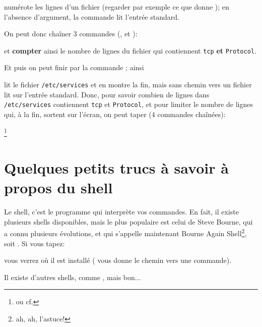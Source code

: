 \begin{itemize}
\begin{itemize}
    numérote les lignes d'un
    fichier (regarder par exemple ce que donne ); en l'absence d'argument, la commande 
    lit l'entrée standard.

    On peut donc chaîner 3 commandes (,  et ):
    

    et \textbf{compter} ainsi le nombre de lignes du fichier
     qui contiennent \texttt{tcp} \textbf{et}
    \texttt{Protocol}.

    Et puis on peut finir par la commande ; ainsi


   lit le fichier \texttt{/etc/services} et en montre la fin, mais
    sans chemin vers un fichier 
      lit sur l'entrée standard. Donc, pour savoir combien de lignes
      dans \texttt{/etc/services} contiennent \texttt{tcp} et
      \texttt{Protocol}, et pour limiter le nombre de lignes qui, à la
      fin, sortent sur l'écran, on
    peut taper (4 commandes chaînées):



    \footnote{ou
       cf. }
    
  \end{itemize}
\end{itemize}
\section{Quelques petits trucs à savoir à propos du shell}
Le shell, c'est le programme qui interprète vos commandes. En fait, il
existe plusieurs shells disponibles, mais le plus populaire est celui
de \textsf{Steve 
Bourne}, qui a connu plusieurs évolutions, et qui s'appelle maintenant
\og \textsf{Bourne Again Shell}\footnote{ah, ah, l'astuce!}\fg{}, soit
. Si 
vous tapez:


vous verrez où il est installé ( vous donne le chemin vers
une commande).

Il existe d'autres shells, comme , mais bon...

